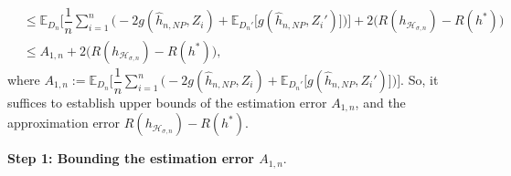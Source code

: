 \documentclass[10pt,twoside]{article}
\numberwithin{equation}{section}
\newcommand{\E}{\ensuremath{\mathbb{E}}}
\begin{document}
\begin{align} 
%
\label{Exp_excess_risk_v0} &  \leq \E_{D_n} \Bigg[ \dfrac{1}{n} \sum_{i=1}^n \Big(-2g(\widehat{h}_{n,NP}, Z_i) + \E_{D_n'} \big[g(\widehat{h}_{n,NP}, Z_i')\big] \Big) \Bigg] + 2\big(R( h_{\mathcal{H}_{\sigma, n}}) - R(h^*) \big)
\\
\label{equa_bound_excess_risk_v1} &  \leq A_{1, n} + 2\big(R( h_{\mathcal{H}_{\sigma, n}}) - R(h^*) \big),
\end{align}
%
where $A_{1, n} :=  \E_{D_n} \Bigg[ \dfrac{1}{n} \sum_{i=1}^n \Big(-2g(\widehat{h}_{n,NP}, Z_i) + \E_{D_n'} \big[g(\widehat{h}_{n,NP}, Z_i')\big] \Big) \Bigg]$.
%
So, it suffices to establish upper bounds of the estimation error $A_{1, n}$, and the approximation error $R( h_{\mathcal{H}_{\sigma, n}}) - R(h^*)$.

\medskip
\noindent
\textbf{Step 1: Bounding the estimation error $A_{1, n}$}. 
%
\end{document}
